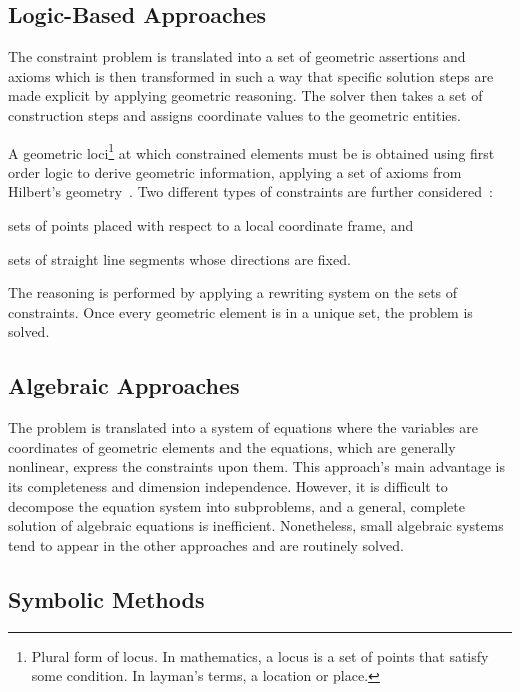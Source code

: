 \subsection{Logic-Based Approaches}%
\label{sec:intro.constraints.logic}

The constraint problem is translated into a set of geometric assertions and
axioms which is then transformed in such a way that specific solution steps are
made explicit by applying geometric reasoning.  The solver then takes a set of
construction steps and assigns coordinate values to the geometric entities.

A geometric loci\footnote{Plural form of locus.  In mathematics, a locus is a
set of points that satisfy some condition.  In layman's terms, a location or
place.} at which constrained elements must be is obtained using first order
logic to derive geometric information, applying a set of axioms from Hilbert's
geometry~\cite{Aldefeld:1988:VGBGRM,Bruderlin:1993:USGRRSGSS,Sohrt:1991:IC3DM}.
Two different types of constraints are further
considered~\cite{Sunde:1987:CADSDSS,Verroust:1992:RMPCAD}:
\begin{enumerate*}[label= (\arabic*)]
  \item sets of points placed with respect to a local coordinate frame, and 
  \item sets of straight line segments whose directions are fixed.
\end{enumerate*}
The reasoning is performed by applying a rewriting system on the sets of
constraints.  Once every geometric element is in a unique set, the problem is
solved.

\subsection{Algebraic Approaches}%
\label{sec:intro.constraints.algebraic}

The problem is translated into a system of equations where the variables are
coordinates of geometric elements and the equations, which are generally
nonlinear, express the constraints upon them.  This approach's main advantage is
its completeness and dimension independence.  However, it is difficult to
decompose the equation system into subproblems, and a general, complete solution
of algebraic equations is inefficient.  Nonetheless, small algebraic systems
tend to appear in the other approaches and are routinely solved.

\subsection{Symbolic Methods}%
\label{sec:intro.constraints.symbolic}

